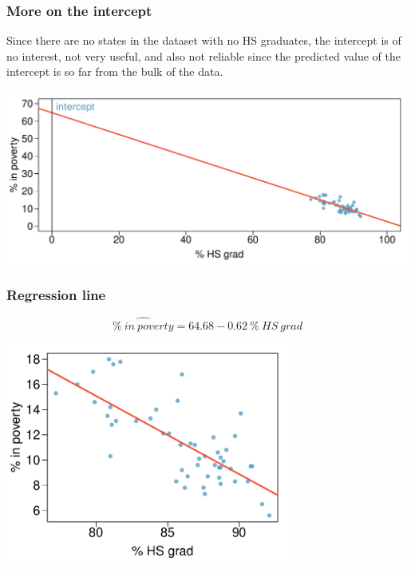 
\begin{frame}
\frametitle{More on the intercept}

Since there are no states in the dataset with no HS graduates, the intercept is of no interest, not very useful, and also not reliable since the predicted value of the intercept is so far from the bulk of the data.

\begin{center}
\includegraphics[width=\textwidth]{7-2_least_square_reg/figures/poverty/poverty_hsgrad_line_wide}
\end{center}

\end{frame}


\begin{frame}
\frametitle{Regression line}

\[ \widehat{\%~in~poverty} = 64.68 - 0.62~\%~HS~grad \]

\begin{center}
\includegraphics[width=0.7\textwidth]{7-2_least_square_reg/figures/poverty/poverty_hsgrad_line}
\end{center}

\end{frame}

